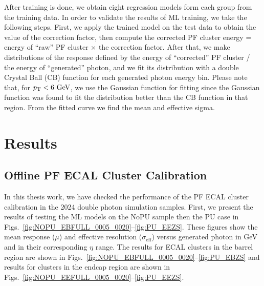\noindent
After training is done, we obtain eight regression models form each group from the training data.
In order to validate the results of ML training, we take the following steps.
First, we apply the trained model on the test data to obtain the value of the correction factor,
then compute the corrected PF cluster energy = energy of ``raw'' PF cluster $\times$ the correction factor.
After that, we make distributions of the response defined by the energy of ``corrected'' PF cluster / the energy of ``generated'' photon, and
we fit its distribution with a double Crystal Ball (CB) function for each generated photon energy bin.
Please note that, for $p_{\mathrm{T}}<6\ \text{Ge\hspace{-.08em}V}$, we use the Gaussian function for fitting since the Gaussian function was found to fit the distribution better than the CB function in that \pt region.
From the fitted curve we find the mean and effective sigma.

\section{Results}

\subsection{Offline PF ECAL Cluster Calibration}

In this thesis work,
we have checked the performance of the PF ECAL cluster calibration in the 2024 double photon simulation samples.
%
%
First, we present the results of testing the ML models on the NoPU sample then the PU case in Figs.~\ref{fig:NOPU_EBFULL_0005_0020}--\ref{fig:PU_EEZS}.
These figures show the mean response ($\mu$) and effective resolution ($\sigma_\mathrm{eff}$) versus generated photon \pt in GeV and in their corresponding $\eta$ range.
The results for ECAL clusters in the barrel region are shown in Figs.~\ref{fig:NOPU_EBFULL_0005_0020}--\ref{fig:PU_EBZS}
and results for clusters in the endcap region are shown in Figs.~\ref{fig:NOPU_EEFULL_0005_0020}--\ref{fig:PU_EEZS}.

